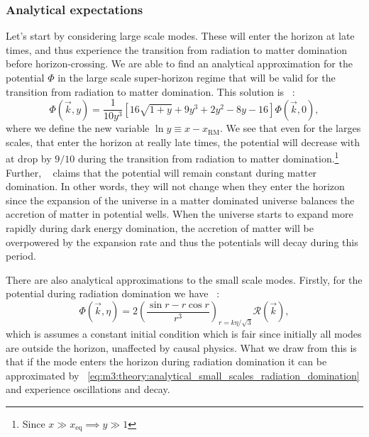 \subsubsection{Analytical expectations}\label{sec:m3:theory:analytical_expectations}
    Let's start by considering large scale modes. These will enter the horizon at late times, and thus experience the transition from radiation to matter domination before horizon-crossing. We are able to find an analytical approximation for the potential $\Phi$ in the large scale super-horizon regime that will be valid for the transition from radiation to matter domination. This solution is ~\cite[Eq. 8.31]{dodelson2020modern}:
    \begin{equation}\label{eq:m3:theory:analytical_large_scale_super_horizon}
        \Phi(\vec{k},y) = \frac{1}{10y^3}\left[16\sqrt{1+y} + 9y^3 + 2y^2-8y-16\right]\Phi(\vec{k},0),
    \end{equation}
    where we define the new variable $\ln y \equiv x-x_\mathrm{RM}$. We see that even for the larges scales, that enter the horizon at really late times, the potential will decrease with at drop by $9/10$ during the transition from radiation to matter domination.\footnote{Since $x\gg x_\mathrm{eq} \implies y\gg 1$} Further, ~\cite{dodelson2020modern} claims that the potential will remain constant during matter domination. In other words, they will not change when they enter the horizon since the expansion of the universe in a matter dominated universe balances the accretion of matter in potential wells. When the universe starts to expand more rapidly during dark energy domination, the accretion of matter will be overpowered by the expansion rate and thus the potentials will decay during this period. 

    There are also analytical approximations to the small scale modes. Firstly, for the potential during radiation domination we have ~\cite[Eq. 8.46]{dodelson2020modern}:
    \begin{equation}\label{eq:m3:theory:analytical_small_scales_radiation_domination}
        \Phi(\vec{k},\eta) = 2\left(\frac{\sin{r} - r\cos{r}}{r^3}\right)_{r=k\eta/\sqrt{3}}\mathcal{R}(\vec{k}),
    \end{equation}
    which is assumes a constant initial condition which is fair since initially all modes are outside the horizon, unaffected by causal physics. What we draw from this is that if the mode enters the horizon during radiation domination it can be approximated by ~\cref{eq:m3:theory:analytical_small_scales_radiation_domination} and experience oscillations and decay. 

